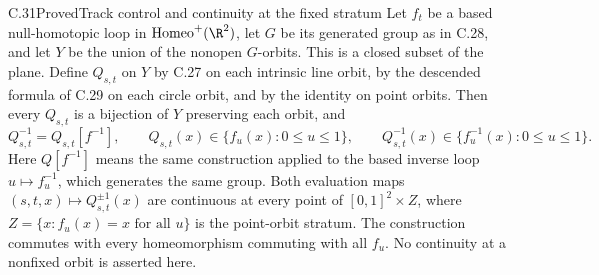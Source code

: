 \begin{claim}{C.31}{Proved}{Track control and continuity at the fixed stratum}
Let $f_t$ be a based null-homotopic loop in
$\operatorname{Homeo}^+(\R^2)$, let $G$ be its generated group as in
C.28, and let $Y$ be the union of the nonopen $G$-orbits. This is a
closed subset of the plane. Define $Q_{s,t}$ on $Y$ by C.27 on each
intrinsic line orbit, by the descended formula of C.29 on each circle
orbit, and by the identity on point orbits. Then every $Q_{s,t}$ is
a bijection of $Y$ preserving each orbit, and
\[
 Q_{s,t}^{-1}=Q_{s,t}[f^{-1}],\qquad
 Q_{s,t}(x)\in\{f_u(x):0\leq u\leq1\},\qquad
 Q_{s,t}^{-1}(x)\in\{f_u^{-1}(x):0\leq u\leq1\}.
                                                        \tag{C.31.1}
\]
Here $Q[f^{-1}]$ means the same construction applied to the based
inverse loop $u\mapsto f_u^{-1}$, which generates the same group.
Both evaluation maps $(s,t,x)\mapsto Q_{s,t}^{\pm1}(x)$ are continuous
at every point of $[0,1]^2\times Z$, where
$Z=\{x:f_u(x)=x\text{ for all }u\}$ is the point-orbit stratum.
The construction commutes with every homeomorphism commuting with
all $f_u$. No continuity at a nonfixed orbit is asserted here.
\end{claim}
